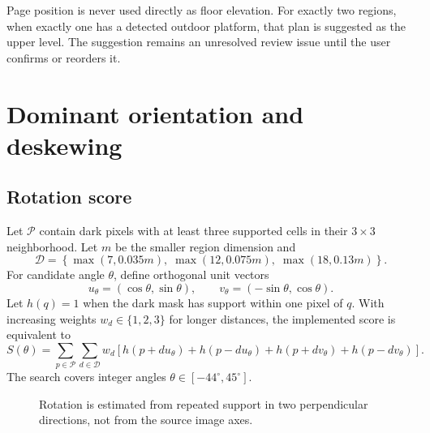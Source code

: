 \documentclass[11pt,a4paper]{article}
\begin{document}
Page position is never used directly as floor elevation. For exactly two regions, when exactly one has a detected outdoor platform, that plan is suggested as the upper level. The suggestion remains an unresolved review issue until the user confirms or reorders it.

\section{Dominant orientation and deskewing}

\subsection{Rotation score}

Let $\mathcal P$ contain dark pixels with at least three supported cells in their $3\times3$ neighborhood. Let $m$ be the smaller region dimension and
\begin{equation}
\mathcal D=\left\{\max(7,0.035m),\;\max(12,0.075m),\;\max(18,0.13m)\right\}.
\end{equation}
For candidate angle $\theta$, define orthogonal unit vectors
\begin{equation}
u_\theta=(\cos\theta,\sin\theta),\qquad
v_\theta=(-\sin\theta,\cos\theta).
\end{equation}
Let $h(q)=1$ when the dark mask has support within one pixel of $q$. With increasing weights $w_d\in\{1,2,3\}$ for longer distances, the implemented score is equivalent to
\begin{equation}
S(\theta)=\sum_{p\in\mathcal P}\sum_{d\in\mathcal D}w_d
\left[h(p+du_\theta)+h(p-du_\theta)+h(p+dv_\theta)+h(p-dv_\theta)\right].
\label{eq:rotation}
\end{equation}
The search covers integer angles $\theta\in[-44^\circ,45^\circ]$.

\begin{figure}[htbp]
\centering
{}
\caption{Rotation is estimated from repeated support in two perpendicular directions, not from the source image axes.}
\label{fig:rotation}
\end{figure}
\end{document}
